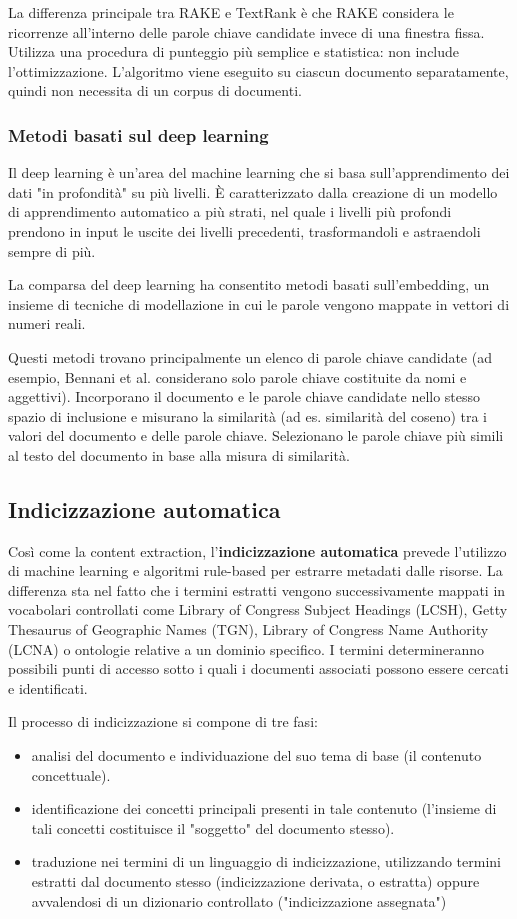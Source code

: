 La differenza principale tra RAKE e TextRank è che RAKE considera le ricorrenze all'interno delle parole chiave candidate invece di una finestra fissa. Utilizza una procedura di punteggio più semplice e statistica: non include l'ottimizzazione. L'algoritmo viene eseguito su ciascun documento separatamente, quindi non necessita di un corpus di documenti.

\subsubsection{Metodi basati sul deep learning}
Il deep learning è un’area del machine learning che si basa sull’apprendimento dei dati "in profondità" su più livelli. È caratterizzato dalla creazione di un modello di apprendimento automatico a più strati, nel quale i livelli più profondi prendono in input le uscite dei livelli precedenti, trasformandoli e astraendoli sempre di più.

La comparsa del deep learning ha consentito metodi basati sull'embedding, un insieme di tecniche di modellazione in cui le parole vengono mappate in vettori di numeri reali. 

Questi metodi trovano principalmente un elenco di parole chiave candidate (ad esempio, Bennani et al. considerano solo parole chiave costituite da nomi e aggettivi). Incorporano il documento e le parole chiave candidate nello stesso spazio di inclusione e misurano la similarità (ad es. similarità del coseno) tra i valori del documento e delle parole chiave. Selezionano le parole chiave più simili al testo del documento in base alla misura di similarità.

\subsection{Indicizzazione automatica}
Così come la content extraction, l'\textbf{indicizzazione automatica} prevede l'utilizzo di machine learning e algoritmi rule-based per estrarre metadati dalle risorse. La differenza sta nel fatto che i termini estratti vengono successivamente mappati in vocabolari controllati come Library of Congress Subject Headings (LCSH), Getty Thesaurus of Geographic Names (TGN), Library of Congress Name Authority (LCNA) o ontologie relative a un dominio specifico. I termini determineranno possibili punti di accesso sotto i quali i documenti associati possono essere cercati e identificati.

Il processo di indicizzazione si compone di tre fasi:
\begin{itemize}
\item analisi del documento e individuazione del suo tema di base (il contenuto concettuale).
\item identificazione dei concetti principali presenti in tale contenuto (l'insieme di tali concetti costituisce il "soggetto" del documento stesso).
\item traduzione nei termini di un linguaggio di indicizzazione, utilizzando termini estratti dal documento stesso (indicizzazione derivata, o estratta) oppure avvalendosi di un dizionario controllato ("indicizzazione assegnata")
\end{itemize}

